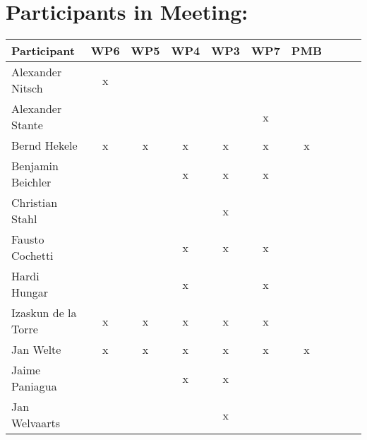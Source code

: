 \documentclass[a4paper, 11pt]{article}
\begin{document}
\section{Participants in Meeting:}

\begin{tabular}{|l|c|c|c||c|c|c||c|c|c|}
\hline
\textbf{Participant} & \textbf{WP6} &  \textbf{WP5} & \textbf{WP4}&  \textbf{WP3} & \textbf{WP7}&  \textbf{PMB} \\\hline
Alexander Nitsch     & x &   &   &   &   &   \\\hline  
Alexander Stante     &   &   &   &   & x &   \\\hline 
Bernd Hekele         & x & x & x & x & x & x \\\hline
Benjamin Beichler    &   &   & x & x & x &   \\\hline
Christian Stahl      &   &   &   & x &   &   \\\hline
Fausto Cochetti      &   &   & x & x & x &   \\\hline
Hardi Hungar         &   &   & x &   & x &   \\\hline
Izaskun de la Torre  & x & x & x & x & x &   \\\hline
Jan Welte            & x & x & x & x & x & x \\\hline
Jaime Paniagua       &   &   & x & x &   &   \\\hline
Jan Welvaarts        &   &   &   & x &   &   \\\hline

\end{tabular}
\end{document}

